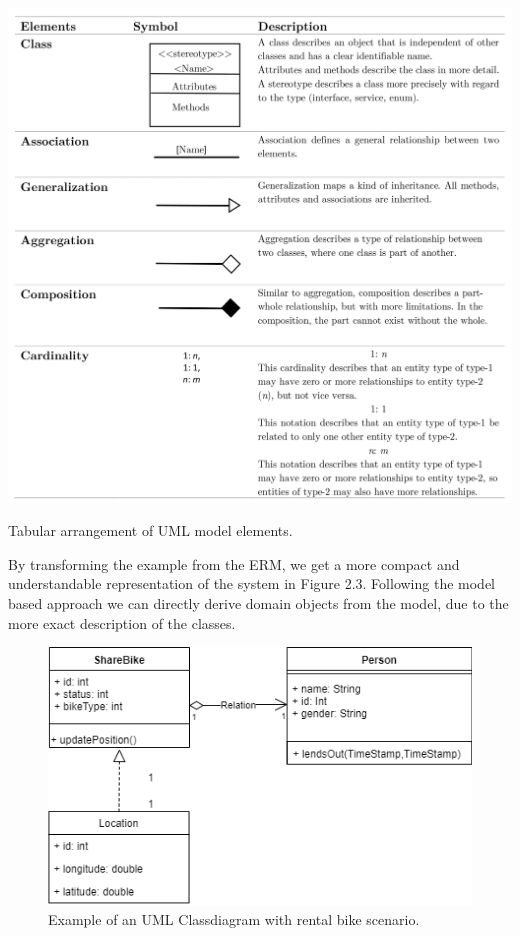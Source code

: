 \begin{table}[!hb]
	\centering
	\label{tbl:TableLatexShortened}
	\includegraphics[scale=0.3]{ExampleUML-1}
	\caption{Tabular arrangement of UML model elements.}
\end{table}

By transforming the example from the ERM, we get a more compact and understandable representation of the system in Figure 2.3. Following the model based approach we can directly derive domain objects from the model, due to the more exact description of the classes. 
\begin{figure}[!hb]
	\centering
	\includegraphics[scale=0.6]{UMLExample}
	\caption{Example of an UML Classdiagram with rental bike scenario.}
\end{figure}

